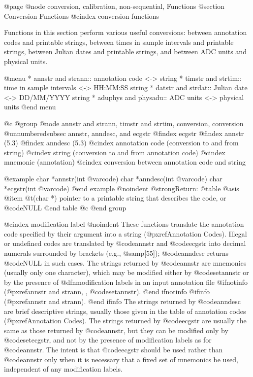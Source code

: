 {{{{{{{{@page
@node     conversion, calibration, non-sequential, Functions
@section Conversion Functions
@cindex conversion functions

Functions in this section perform various useful conversions:  between
annotation codes and printable strings, between times in sample intervals
and printable strings, between Julian dates and printable strings, and between
ADC units and physical units.

@menu
* annstr and strann::		annotation code <-> string
* timstr and strtim::		time in sample intervals <-> HH:MM:SS string
* datstr and strdat::		Julian date <-> DD/MM/YYYY string
* aduphys and physadu::		ADC units <-> physical units
@end menu

@c @group
@node     annstr and strann, timstr and strtim, conversion, conversion
@unnumberedsubsec annstr, anndesc, and ecgstr
@findex ecgstr
@findex annstr (5.3)
@findex anndesc (5.3)
@cindex annotation code (conversion to and from string)
@cindex string (conversion to and from annotation code)
@cindex mnemonic (annotation)
@cindex conversion between annotation code and string

@example
char *annstr(int @var{code})
char *anndesc(int @var{code})
char *ecgstr(int @var{code})
@end example
@noindent
@strong{Return:}
@table @asis
@item @t{(char *)}
pointer to a printable string that describes the code, or @code{NULL}
@end table
@c @end group

@cindex modification label
@noindent
These functions translate the annotation code specified by their argument
into a string (@pxref{Annotation Codes}).  Illegal or undefined codes
are translated by @code{annstr} and @code{ecgstr} into decimal numerals
surrounded by brackets (e.g., @samp{[55]}); @code{anndesc} returns @code{NULL}
in such cases.  The strings returned by @code{annstr} are mnemonics
(usually only one character), which may be modified either by @code{setannstr}
or by the presence of @dfn{modification labels} in an input annotation file
@ifnotinfo
(@pxref{annstr and strann, , @code{setannstr}}).
@end ifnotinfo
@ifinfo
(@pxref{annstr and strann}).
@end ifinfo
The strings returned by @code{anndesc} are brief descriptive strings,
usually those given in the table of annotation codes
(@pxref{Annotation Codes}).  The strings returned by
@code{ecgstr} are usually the same as those returned by @code{annstr},
but they can be modified only by @code{setecgstr}, and not by the
presence of modification labels as for @code{annstr}.  The intent is
that @code{ecgstr} should be used rather than @code{annstr} only when
it is necessary that a fixed set of mnemonics be used, independent of
any modification labels.

}}}}}}}}
